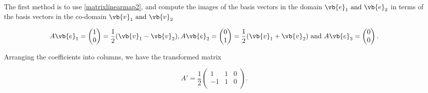 \documentclass[a4paper,12pt]{report}
\begin{document}
{The first method is to use \cref{matrixlinearmap2}, and compute the images of the basis vectors in the domain \(\vb{e} _{1} \text { and } \vb{e} _{2} \) in terms of the basis vectors in the co-domain \(\vb{v} _{1} \text { and } \vb{v} _{2} \)

\begin{equation}
    A \vb{e} _{1} = \begin{pmatrix}
         1 \\
         0 \\
    \end{pmatrix} = \frac{1}{2}(\vb{v} _{1} - \vb{v} _{2}  ),  A\vb{e} _{2} = \begin{pmatrix}
         0 \\
         1 \\
    \end{pmatrix} = \frac{1}{2} (\vb{v} _{1}+ \vb{v} _{2}  ) \text { and } A\vb{e} _{3} = \begin{pmatrix}
         0 \\
         0 \\
    \end{pmatrix}.
\end{equation}

Arranging the coefficients into columns, we have the transformed matrix 

\begin{equation}
    A' = \frac{1}{2} \begin{pmatrix}
        1 &  1 & 0 \\
        -1 &  1 & 0 \\
    \end{pmatrix}.
\end{equation}
} 
\end{document}
